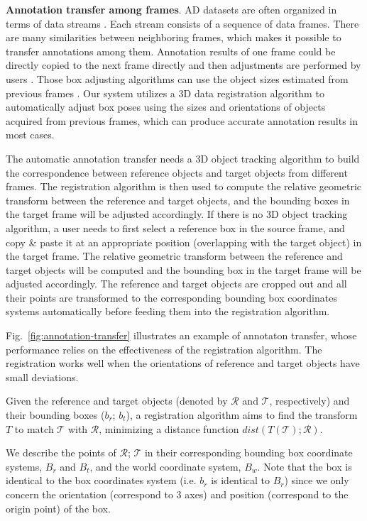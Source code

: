 \documentclass[letterpaper, 10 pt, conference]{ieeeconf}  %
\begin{document}
\textbf{Annotation transfer among frames}. 
AD datasets are often organized in terms of data streams \cite{Caesar2019nuScenesAM,Patil2019TheHD,lyft2019}. Each stream consists of a sequence of data frames. 
There are many similarities between neighboring frames, which makes it possible to transfer annotations among them. 
Annotation results of one frame could be directly copied to the next frame directly and then adjustments are performed by users \cite{Zimmer20193DBA}.
Those box adjusting algorithms can use the object sizes estimated from previous frames \cite{Wang2019LATTEAL}. 
Our system utilizes a 3D data registration algorithm \cite{Yang2016GoICPAG} to automatically adjust box poses using the sizes and orientations of objects acquired from previous frames,
which can produce accurate annotation results in most cases.

The automatic annotation transfer needs a 3D object tracking algorithm to build the correspondence between reference objects and target objects from different frames. 
The registration algorithm is then used to compute the relative geometric transform between the reference and target objects, 
and the bounding boxes in the target frame will be adjusted accordingly.
If there is no 3D object tracking algorithm, a user needs to first select a reference box in the source frame, and copy \& paste it at an appropriate position (overlapping with the target object) in the target frame. 
The relative geometric transform between the reference and target objects will be computed and the bounding box in the target frame will be adjusted accordingly.
The reference and target objects are cropped out and all their points are transformed to the corresponding bounding box coordinates systems automatically
before feeding them into the registration algorithm.

Fig.~\ref{fig:annotation-transfer} illustrates an example of annotaton transfer, whose performance relies on the effectiveness of the registration algorithm. 
The registration works well when the orientations of reference and target objects have small deviations.

Given the reference and target objects (denoted by $\mathcal{R}$ and $\mathcal{T}$, respectively) and their bounding boxes ($b_r$; $b_t$), a registration algorithm aims to find the transform $T$ to match $\mathcal{T}$ with $\mathcal{R}$, minimizing a distance function $dist(T(\mathcal{T}); \mathcal{R} )$.

We describe the points of $\mathcal{R}$; $\mathcal{T}$ in their corresponding bounding box coordinate systems, $B_r$ and $B_t$, and the world coordinate system, $B_w$. 
Note that the box is identical to the box coordinates system (i.e. $b_r$ is identical to $B_r$) since we only concern the orientation (correspond to 3 axes) and position
(correspond to the origin point) of the box.
\end{document}
